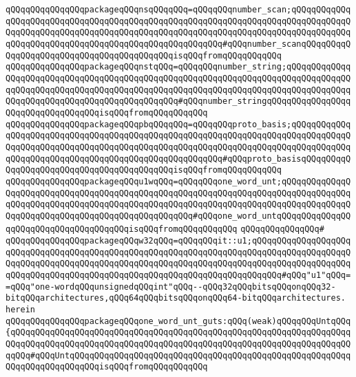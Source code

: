 \verb|qQQqqQQqqQQqqQQqpackageqQQqnsqQQqqQQq=qQQqqQQqnumber_scan;qQQqqQQqqQQqqQQqqQQqqQQqqQQqqQQqqQQqqQQqqQQqqQQqqQQqqQQqqQQqqQQqqQQqqQQqqQQqqQQqqQQqqQQqqQQqqQQqqQQqqQQqqQQqqQQqqQQqqQQqqQQqqQQqqQQqqQQqqQQqqQQqqQQqqQQqqQQqqQQqqQQqqQQqqQQqqQQqqQQqqQQqqQQqqQQqqQQq#qQQqnumber_scanqQQqqQQqqQQqqQQqqQQqqQQqqQQqqQQqqQQqqQQqqQQqisqQQqfromqQQqqQQqqQQq|\newline
\verb|qQQqqQQqqQQqqQQqpackageqQQqnstqQQq=qQQqqQQqnumber_string;qQQqqQQqqQQqqQQqqQQqqQQqqQQqqQQqqQQqqQQqqQQqqQQqqQQqqQQqqQQqqQQqqQQqqQQqqQQqqQQqqQQqqQQqqQQqqQQqqQQqqQQqqQQqqQQqqQQqqQQqqQQqqQQqqQQqqQQqqQQqqQQqqQQqqQQqqQQqqQQqqQQqqQQqqQQqqQQqqQQqqQQqqQQq#qQQqnumber_stringqQQqqQQqqQQqqQQqqQQqqQQqqQQqqQQqqQQqisqQQqfromqQQqqQQqqQQq|\newline
\verb|qQQqqQQqqQQqqQQqpackageqQQqpbqQQqqQQq=qQQqqQQqproto_basis;qQQqqQQqqQQqqQQqqQQqqQQqqQQqqQQqqQQqqQQqqQQqqQQqqQQqqQQqqQQqqQQqqQQqqQQqqQQqqQQqqQQqqQQqqQQqqQQqqQQqqQQqqQQqqQQqqQQqqQQqqQQqqQQqqQQqqQQqqQQqqQQqqQQqqQQqqQQqqQQqqQQqqQQqqQQqqQQqqQQqqQQqqQQqqQQqqQQq#qQQqproto_basisqQQqqQQqqQQqqQQqqQQqqQQqqQQqqQQqqQQqqQQqqQQqisqQQqfromqQQqqQQqqQQq|\newline
\verb|qQQqqQQqqQQqqQQqpackageqQQqu1wqQQq=qQQqqQQqone_word_unt;qQQqqQQqqQQqqQQqqQQqqQQqqQQqqQQqqQQqqQQqqQQqqQQqqQQqqQQqqQQqqQQqqQQqqQQqqQQqqQQqqQQqqQQqqQQqqQQqqQQqqQQqqQQqqQQqqQQqqQQqqQQqqQQqqQQqqQQqqQQqqQQqqQQqqQQqqQQqqQQqqQQqqQQqqQQqqQQqqQQqqQQqqQQqqQQq#qQQqone_word_untqQQqqQQqqQQqqQQqqQQqqQQqqQQqqQQqqQQqqQQqisqQQqfromqQQqqQQqqQQq|\newline
\verb|qQQqqQQqqQQqqQQq#|\newline
\verb|qQQqqQQqqQQqqQQqpackageqQQqw32qQQq=qQQqqQQqit::u1;qQQqqQQqqQQqqQQqqQQqqQQqqQQqqQQqqQQqqQQqqQQqqQQqqQQqqQQqqQQqqQQqqQQqqQQqqQQqqQQqqQQqqQQqqQQqqQQqqQQqqQQqqQQqqQQqqQQqqQQqqQQqqQQqqQQqqQQqqQQqqQQqqQQqqQQqqQQqqQQqqQQqqQQqqQQqqQQqqQQqqQQqqQQqqQQqqQQqqQQqqQQqqQQqqQQqqQQq#qQQq"u1"qQQq==qQQq"one-wordqQQqunsignedqQQqint"qQQq--qQQq32qQQqbitsqQQqonqQQq32-bitqQQqarchitectures,qQQq64qQQqbitsqQQqonqQQq64-bitqQQqarchitectures.|\newline
\verb|herein|\newline
\newline
\verb|qQQqqQQqqQQqqQQqpackageqQQqone_word_unt_guts:qQQq(weak)qQQqqQQqUntqQQq{qQQqqQQqqQQqqQQqqQQqqQQqqQQqqQQqqQQqqQQqqQQqqQQqqQQqqQQqqQQqqQQqqQQqqQQqqQQqqQQqqQQqqQQqqQQqqQQqqQQqqQQqqQQqqQQqqQQqqQQqqQQqqQQqqQQqqQQqqQQqqQQq#qQQqUntqQQqqQQqqQQqqQQqqQQqqQQqqQQqqQQqqQQqqQQqqQQqqQQqqQQqqQQqqQQqqQQqqQQqqQQqqQQqisqQQqfromqQQqqQQqqQQq|\newline
